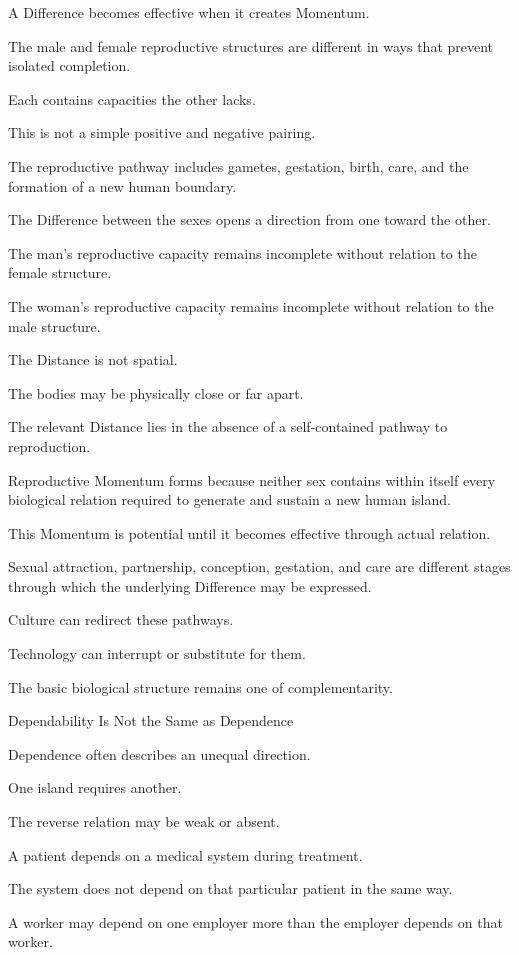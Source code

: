 A Difference becomes effective when it creates Momentum.

The male and female reproductive structures are different in ways that prevent isolated completion.

Each contains capacities the other lacks.

This is not a simple positive and negative pairing.

The reproductive pathway includes gametes, gestation, birth, care, and the formation of a new human boundary.

The Difference between the sexes opens a direction from one toward the other.

The man’s reproductive capacity remains incomplete without relation to the female structure.

The woman’s reproductive capacity remains incomplete without relation to the male structure.

The Distance is not spatial.

The bodies may be physically close or far apart.

The relevant Distance lies in the absence of a self-contained pathway to reproduction.

Reproductive Momentum forms because neither sex contains within itself every biological relation required to generate and sustain a new human island.

This Momentum is potential until it becomes effective through actual relation.

Sexual attraction, partnership, conception, gestation, and care are different stages through which the underlying Difference may be expressed.

Culture can redirect these pathways.

Technology can interrupt or substitute for them.

The basic biological structure remains one of complementarity.

Dependability Is Not the Same as Dependence

Dependence often describes an unequal direction.

One island requires another.

The reverse relation may be weak or absent.

A patient depends on a medical system during treatment.

The system does not depend on that particular patient in the same way.

A worker may depend on one employer more than the employer depends on that worker.

